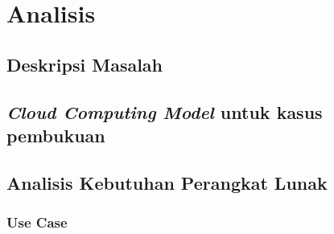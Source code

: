 \chapter{Analisis}
\label{chap:analisis}

\section{Deskripsi Masalah}
\label{sec:deskripsimasalah}

\section{\textit{Cloud Computing Model} untuk kasus pembukuan}

\section{Analisis Kebutuhan Perangkat Lunak}
\label{sec:akpl}

\subsection{Use Case}
\label{sec:usecase}
